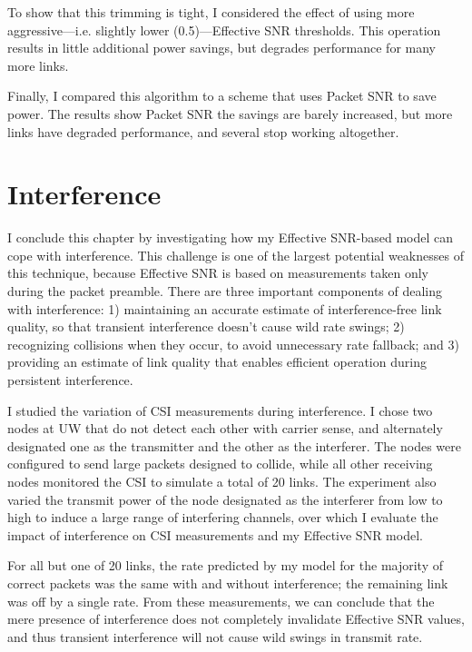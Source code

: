 To show that this trimming is tight, I considered the effect of using more aggressive---i.e. slightly lower (0.5\dB)---Effective SNR thresholds. This operation results in little additional power savings, but degrades performance for many more links.

Finally, I compared this algorithm to a scheme that uses Packet SNR to save power. The results show Packet SNR the savings are barely increased, but more links have degraded performance, and several stop working altogether.


\section{Interference}
\label{sec:interference}
I conclude this chapter by investigating how my Effective SNR-based model can cope with interference. This challenge is one of the largest potential weaknesses of this technique, because Effective SNR is based on measurements taken only during the packet preamble. There are three important components of dealing with interference: 1) maintaining an accurate estimate of interference-free link quality, so that transient interference doesn't cause wild rate swings; 2) recognizing collisions when they occur, to avoid unnecessary rate fallback; and 3) providing an estimate of link quality that enables efficient operation during persistent interference.

I studied the variation of CSI measurements during interference. I chose two nodes at UW that do not detect each other with carrier sense, and alternately designated one as the transmitter and the other as the interferer. The nodes were configured to send large packets designed to collide, while all other receiving nodes monitored the CSI to simulate a total of 20 links. The experiment also varied the transmit power of the node designated as the interferer from low to high to induce a large range of interfering channels, over which I evaluate the impact of interference on CSI measurements and my Effective SNR model.

For all but one of 20 links, the rate predicted by my model for the majority of correct packets was the same with and without interference; the remaining link was off by a single rate. From these measurements, we can conclude that the mere presence of interference does not completely invalidate Effective SNR values, and thus transient interference will not cause wild swings in transmit rate.

